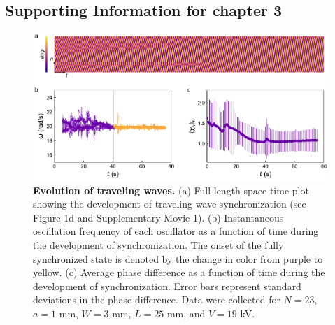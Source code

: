 \begin{appendices}



\chapter{Supporting Information for chapter 3}

\begin{figure}[p]
    \centering
    \includegraphics{figures/A2_SI1-v3.pdf}
    \caption{\textbf{Evolution of traveling waves.} (a) Full length space-time plot showing the development of traveling wave synchronization (see Figure 1d and Supplementary Movie 1). (b) Instantaneous oscillation frequency of each oscillator as a function of time during the development of synchronization. The onset of the fully synchronized state is denoted by the change in color from purple to yellow. (c) Average phase difference as a function of time during the development of synchronization. Error bars represent standard deviations in the phase difference. Data were collected for $N=23$, $a=1$ mm, $W=3$ mm, $L=25$ mm, and $V=19$ kV.}
    \label{fig:SI1}
\end{figure}



\end{appendices}
